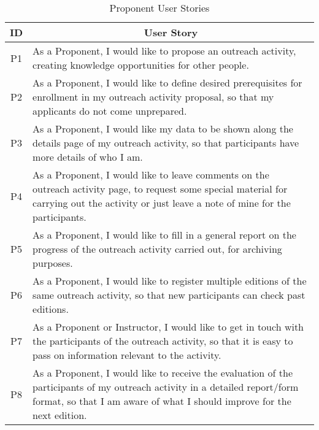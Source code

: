 \begin{table}[!htb]
  \centering
  \setlength{\aboverulesep}{0pt}
  \setlength{\belowrulesep}{0pt}
  \caption{Proponent User Stories}
  \label{tab:proponent-user-stories}
  \footnotesize
  \begin{tabularx}{\textwidth}{c|X}
    \toprule
    \rowcolor[rgb]{0.753,0.753,0.753} \textbf{ID} & \multicolumn{1}{c}{\textbf{User Story}}                    \\
    \hline
    \rowcolor[rgb]{0.898,0.898,0.898} P1          & As a Proponent, I would like to propose an outreach activity, creating knowledge opportunities for other people.                                           \\
    P2                                            & As a Proponent, I would like to define desired prerequisites for enrollment in my outreach activity proposal, so that my applicants do not come unprepared.                                      \\
    \rowcolor[rgb]{0.898,0.898,0.898} P3          & As a Proponent, I would like my data to be shown along the details page of my outreach activity, so that participants have more details of who I am.                                \\
    P4                                            & As a Proponent, I would like to leave comments on the outreach activity page, to request some special material for carrying out the activity or just leave a note of mine for the participants.                              \\
    \rowcolor[rgb]{0.898,0.898,0.898} P5          & As a Proponent, I would like to fill in a general report on the progress of the outreach activity carried out, for archiving purposes.                                \\
    P6                                            & As a Proponent, I would like to register multiple editions of the same outreach activity, so that new participants can check past editions.                              \\
    \rowcolor[rgb]{0.898,0.898,0.898} P7          & As a Proponent or Instructor, I would like to get in touch with the participants of the outreach activity, so that it is easy to pass on information relevant to the activity.                                \\
    P8                                            & As a Proponent, I would like to receive the evaluation of the participants of my outreach activity in a detailed report/form format, so that I am aware of what I should improve for the next edition.                              \\
    \bottomrule
  \end{tabularx}
\end{table}